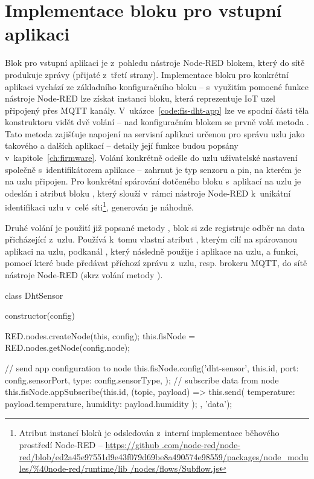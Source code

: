 \section{Implementace bloku pro vstupní aplikaci}\label{sec:implementace-bloku-pro-vstupni-aplikaci}
Blok pro vstupní aplikaci je z~pohledu nástroje Node-RED blokem, který do sítě produkuje zprávy (přijaté z~třetí
strany).
Implementace bloku pro konkrétní aplikaci vychází ze základního konfiguračního bloku -- s~využitím pomocné funkce
nástroje Node-RED  lze získat instanci bloku, která reprezentuje IoT uzel připojený přes MQTT
kanály.
V~ukázce~\ref{code:fis-dht-app} lze ve spodní části těla konstruktoru vidět dvě volání -- nad konfiguračním blokem se
prvně volá metoda .
Tato metoda zajišťuje napojení na servisní aplikaci určenou pro správu uzlu jako takového a dalších aplikací --
detaily její funkce budou popsány v~kapitole~\ref{ch:firmware}.
Volání konkrétně odešle do uzlu uživatelské nastavení společně s~identifikátorem aplikace  -- zahrnut
je typ senzoru a pin, na kterém je na uzlu připojen.
Pro konkrétní spárování dotčeného bloku s~aplikací na uzlu je odeslán i atribut bloku , který slouží
v~rámci nástroje Node-RED k~unikátní identifikaci uzlu v~celé síti\footnote{Atribut  instancí bloků je
odsledován z~interní implementace běhového prostředí Node-RED -- \url{https://github
.com/node-red/node-red/blob/ed2a45e97551d9e43f079d69be8a490574e98559/packages/node_modules/\%40node-red/runtime/lib
/nodes/flows/Subflow.js}}, generován je náhodně.

Druhé volání je použití již popsané metody , blok si zde registruje odběr na data přicházející
z~uzlu.
Používá k~tomu vlastní atribut , kterým cílí na spárovanou aplikaci na uzlu, podkanál , který
následně použije i aplikace na uzlu, a funkci, pomocí které bude předávat příchozí zprávu z~uzlu, resp. brokeru MQTT,
do sítě nástroje Node-RED (skrz volání metody ).

\begin{code}[
    language=Javascript,
    label=code:fis-dht-app,
    caption={Detail implementace vstupní aplikace (z~hlediska centrálního uzlu) -- konkrétně se jedná o~aplikaci pro
    senzory typu DHT měřící teplotu a vlhkost okolí. }
]
class DhtSensor {
    constructor(config) {
        RED.nodes.createNode(this, config);
        this.fisNode = RED.nodes.getNode(config.node);

        // send app configuration to node
        this.fisNode.config('dht-sensor', this.id, {
            port: config.sensorPort,
            type: config.sensorType,
        });
        // subscribe data from node
        this.fisNode.appSubscribe(this.id, (topic, payload) => {
            this.send({
                temperature: payload.temperature,
                humidity: payload.humidity
            });
        }, 'data');
    }
}
\end{code}

